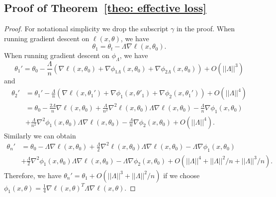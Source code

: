 \documentclass{article}
\theoremstyle{plain}
\begin{document}
\subsection{Proof of Theorem~\ref{theo: effective loss}}
\begin{proof}
For notational simplicity we drop the subscript $\gamma$ in the proof. When running gradient descent on $\ell(x,\theta)$, we have
\begin{equation}
    \theta_1=\theta_t-\Lambda \nabla\ell(x,\theta_0).
\end{equation}
When running gradient descent on $\phi_\Lambda$, we have
\begin{equation}
    \theta_1'=\theta_0-\frac{\Lambda}{n}(\nabla \ell(x,\theta_0)+\nabla\phi_{1\Lambda}(x,\theta_0)+\nabla\phi_{2\Lambda}(x,\theta_0))+O(||\Lambda||^3)
\end{equation}
and
\begin{equation}
\begin{aligned}
\theta_{2}'&=\theta_1'-\frac{\Lambda}{n}(\nabla \ell(x,\theta_{1}')+\nabla\phi_1(x,\theta'_{1})+\nabla\phi_2(x,\theta_1'))+O(||\Lambda||^4)\\
&=\theta_0-\frac{2\Lambda}{n}\nabla\ell(x,\theta_0)+\frac{\Lambda}{n^2}\nabla^2\ell(x,\theta_0)\Lambda\nabla\ell(x,\theta_0)-\frac{\Lambda}{n}\nabla\phi_1(x,\theta_0)\\&+\frac{\Lambda}{n^2}\nabla^2\phi_1(x,\theta_0)\Lambda\nabla\ell(x,\theta_0)-\frac{\Lambda}{n}\nabla\phi_2(x,\theta_0)+O(||\Lambda||^4).
\end{aligned}
\end{equation}
Similarly we can obtain
\begin{equation}
\begin{aligned}
\theta_{n}'
&=\theta_0-\Lambda\nabla\ell(x,\theta_0)+\frac{\Lambda}{2}\nabla^2\ell(x,\theta_0)\Lambda\nabla\ell(x,\theta_0)-\Lambda\nabla\phi_1(x,\theta_0)\\&+\frac{\Lambda}{2}\nabla^2\phi_1(x,\theta_0)\Lambda\nabla\ell(x,\theta_0)-\Lambda\nabla\phi_2(x,\theta_0)+O(||\Lambda||^4+||\Lambda||^2/n+||\Lambda||^3/n).
\end{aligned}
\end{equation}
Therefore, we have $\theta_n'=\theta_1+O(||\Lambda||^3+||\Lambda||^2/n)$ if we choose $\phi_1(x,\theta) = \frac{1}{4} \nabla\ell(x,\theta)^T\Lambda\nabla\ell(x,\theta)$.


\end{proof}
\end{document}
